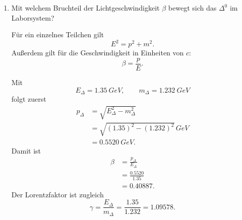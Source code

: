 \documentclass[11pt,a4paper]{scrartcl}
\begin{document}
\begin{enumerate}[label=(\alph*)]
            \begin{answerbox}
                Die Skizze zeigt den entscheidenden Unterschied: Im Laborsystem bewegt sich das
                Gesamtsystem nach rechts, im Schwerpunktsystem ruht das $\Delta^0$ und die beiden
                Zerfallsprodukte haben entgegengesetzte Impulse entlang der $y$-Achse.
            \end{answerbox}

        \item
            Mit welchem Bruchteil der Lichtgeschwindigkeit $\beta$ bewegt sich das $\Delta^0$
            im Laborsystem?

            \begin{calculationbox}
                Für ein einzelnes Teilchen gilt
                \[
                    E^2=p^2+m^2.
                \]
                Außerdem gilt für die Geschwindigkeit in Einheiten von $c$:
                \[
                    \beta=\frac{p}{E}.
                \]

                \begin{calculationbox}
                    Mit
                    \[
                        E_{\Delta}=\SI{1.35}{GeV},
                        \qquad
                        m_{\Delta}=\SI{1.232}{GeV}
                    \]
                    folgt zuerst
                    \begin{align*}
                        p_{\Delta}
                        &=\sqrt{E_{\Delta}^2-m_{\Delta}^2}\\
                        &=\sqrt{(1.35)^2-(1.232)^2}\,\si{GeV}\\
                        &=\SI{0.5520}{GeV}.
                    \end{align*}
                    Damit ist
                    \begin{align*}
                        \beta
                        &=\frac{p_{\Delta}}{E_{\Delta}}\\
                        &=\frac{0.5520}{1.35}\\
                        &=0.40887.
                    \end{align*}
                    Der Lorentzfaktor ist zugleich
                    \[
                        \gamma=\frac{E_{\Delta}}{m_{\Delta}}=\frac{1.35}{1.232}=1.09578.
                    \]
                \end{calculationbox}
            \end{calculationbox}


\end{enumerate}
\end{document}
